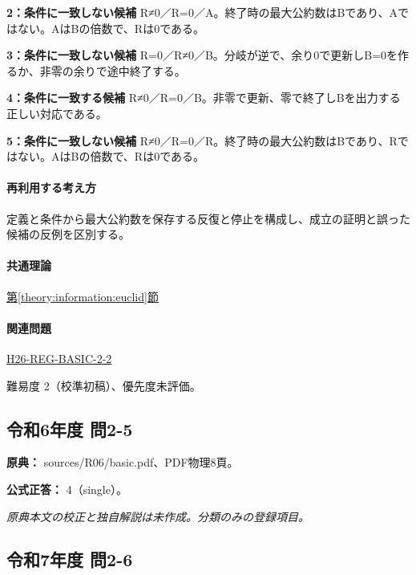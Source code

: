 \noindent\textbf{2：条件に一致しない候補} R≠0／R=\allowbreak{}0／A。終了時の最大公約数はBであり、Aではない。AはBの倍数で、Rは0である。\par

\noindent\textbf{3：条件に一致しない候補} R=\allowbreak{}0／R≠0／B。分岐が逆で、余り0で更新しB=\allowbreak{}0を作るか、非零の余りで途中終了する。\par

\noindent\textbf{4：条件に一致する候補} R≠0／R=\allowbreak{}0／B。非零で更新、零で終了しBを出力する正しい対応である。\par

\noindent\textbf{5：条件に一致しない候補} R≠0／R=\allowbreak{}0／R。終了時の最大公約数はBであり、Rではない。AはBの倍数で、Rは0である。\par

\paragraph{再利用する考え方} 定義と条件から最大公約数を保存する反復と停止を構成し、成立の証明と誤った候補の反例を区別する。

\paragraph{共通理論} \hyperref[theory:information:euclid]{第\ref*{theory:information:euclid}節}

\paragraph{関連問題} \hyperref[q:h26-reg-basic-2-2]{H26-REG-BASIC-2-2}

\par 難易度 2（校準初稿）、優先度未評価。

\subsection{令和6年度 問2-5}
\label{q:r06-reg-basic-2-5}

\noindent\textbf{原典：} sources/R06/basic.pdf、PDF物理8頁。

\textbf{公式正答：} 4（single）。

\par\textit{原典本文の校正と独自解説は未作成。分類のみの登録項目。}

\subsection{令和7年度 問2-6}
\label{q:r07-reg-basic-2-6}

